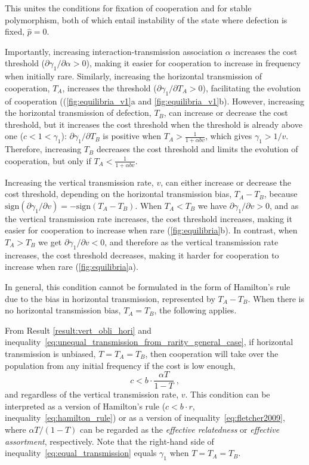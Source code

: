 \documentclass[12pt]{extarticle}
\begin{document}
This unites the conditions for fixation of cooperation and for stable polymorphism, both of which entail instability of the state where defection is fixed, $\hat{p}=0$.

Importantly, increasing interaction-transmission association $\alpha$ increases the cost threshold ($\partial \gamma_1 / \partial \alpha > 0$), making it easier for cooperation to increase in frequency when initially rare.
Similarly, increasing the horizontal transmission of cooperation, $T_A$, increases the threshold ($\partial \gamma_1 / \partial T_A > 0$), facilitating the evolution of cooperation ((\autoref{fig:equilibria_v1}a and \ref{fig:equilibria_v1}b).
However, increasing the horizontal transmission of defection, $T_B$, can increase or decrease the cost threshold, but it increases the cost threshold when the threshold is already above one ($c<1<\gamma_1$): $\partial\gamma_1/\partial T_B$ is positive when $T_A > \frac{1}{1+\alpha b v}$, which gives $\gamma_1>1/v$. 
Therefore, increasing $T_B$ decreases the cost threshold and limits the evolution of cooperation, but only if $T_A < \frac{1}{1+\alpha b v}$.

Increasing the vertical transmission rate, $v$, can either increase or decrease the cost threshold, depending on the horizontal transmission bias, $T_A-T_B$, because $\text{sign}(\partial \gamma_1 / \partial v) = -\text{sign}(T_A-T_B)$.
When $T_A<T_B$ we have $\partial \gamma_1 / \partial v >0$, and as the vertical transmission rate increases, the cost threshold increases, making it easier for cooperation to increase when rare (\autoref{fig:equilibria}b). 
In contrast, when $T_A > T_B$ we get $\partial \gamma_1 / \partial v <0$, and therefore as the vertical transmission rate increases, the cost threshold decreases, making it harder for cooperation to increase when rare (\autoref{fig:equilibria}a).

In general, this condition cannot be formulated in the form of Hamilton's rule due to the bias in horizontal transmission, represented by $T_A-T_B$.
When there is no horizontal transmission bias, $T_A=T_B$, the following applies.

From Result \ref{result:vert_obli_hori} and inequality~\ref{eq:unequal_transmission_from_rarity_general_case}, if horizontal transmission is unbiased, $T=T_A=T_B$, then cooperation will take over the population from any initial frequency if the cost is low enough,
\begin{equation}
\label{eq:equal_transmission}
c < b \cdot \frac{\alpha T}{1-T} \;,
\end{equation}
and regardless of the vertical transmission rate, $v$.
This condition can be interpreted as a version of Hamilton's rule  ($c<b\cdot r$, inequality~\ref{eq:hamilton_rule}) or as a version of inequality~\ref{eq:fletcher2009}, where $\alpha T/(1-T)$ can be regarded as the \emph{effective relatedness} or \emph{effective assortment}, respectively.
Note that the right-hand side of inequality~\ref{eq:equal_transmission} equals $\gamma_1$ when $T=T_A=T_B$.
\end{document}
